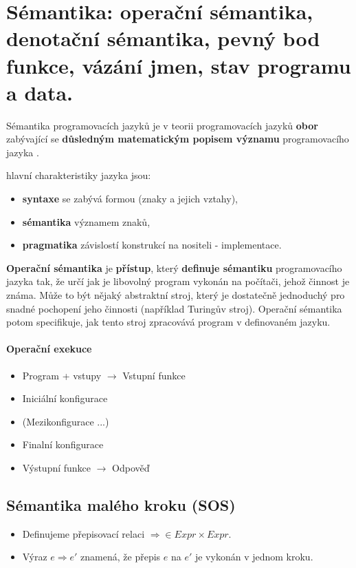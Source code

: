 \section[TPJ - sémantiky: operační, denotační]{Sémantika: operační sémantika, denotační sémantika, pevný bod funkce, vázání jmen, stav programu a data.}

\noindent Sémantika programovacích jazyků je v teorii programovacích jazyků \textbf{obor} zabývající se \textbf{důsledným matematickým popisem významu} programovacího jazyka \cite{wiki:semantika}.

 hlavní charakteristiky jazyka jsou: 

\begin{itemize}[itemsep=0px]
\item \textbf{syntaxe} se zabývá formou (znaky a jejich vztahy),
\item \textbf{sémantika} významem znaků,
\item \textbf{pragmatika} závislostí konstrukcí na nositeli - implementace.
\end{itemize}

\textbf{Operační sémantika} je \textbf{přístup}, který \textbf{definuje sémantiku} programovacího jazyka tak, že určí jak je libovolný program vykonán na počítači, jehož činnost je známa. Může to být nějaký abstraktní stroj, který je dostatečně jednoduchý pro snadné pochopení jeho činnosti (například Turingův stroj). Operační sémantika potom specifikuje, jak tento stroj zpracovává program v definovaném jazyku.

\paragraph{Operační exekuce}

\begin{itemize}[itemsep=0px]
\item Program + vstupy $\rightarrow$ Vstupní funkce
\item Iniciální konfigurace
\item (Mezikonfigurace ...)
\item Finalní konfigurace
\item Výstupní funkce $\rightarrow$ Odpověď
\end{itemize}

\subsection{Sémantika malého kroku (SOS)}
\begin{itemize}[itemsep=0px]
\item Definujeme přepisovací relaci $\Rightarrow \in Expr \times Expr$.
\item Výraz $e \Rightarrow e'$ znamená, že přepis $e$ na $e'$ je vykonán v jednom kroku.
\end{itemize}

